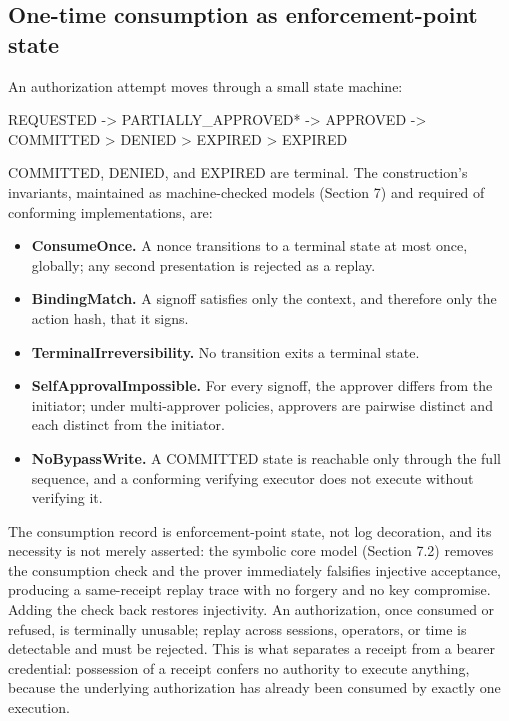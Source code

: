 \documentclass[11pt]{article}
\begin{document}
\subsection{One-time consumption as enforcement-point state}

An authorization attempt moves through a small state machine:

\begin{tool}
REQUESTED -> {PARTIALLY_APPROVED}* -> APPROVED -> COMMITTED
          \-> DENIED                          \-> EXPIRED
          \-> EXPIRED
\end{tool}

COMMITTED, DENIED, and EXPIRED are terminal. The construction's invariants,
maintained as machine-checked models (Section 7) and required of conforming
implementations, are:

\begin{itemize}[leftmargin=*]
\item \textbf{ConsumeOnce.} A nonce transitions to a terminal state at most once,
globally; any second presentation is rejected as a replay.
\item \textbf{BindingMatch.} A signoff satisfies only the context, and therefore
only the action hash, that it signs.
\item \textbf{TerminalIrreversibility.} No transition exits a terminal state.
\item \textbf{SelfApprovalImpossible.} For every signoff, the approver differs
from the initiator; under multi-approver policies, approvers are pairwise distinct
and each distinct from the initiator.
\item \textbf{NoBypassWrite.} A COMMITTED state is reachable only through the full
sequence, and a conforming verifying executor does not execute without verifying
it.
\end{itemize}

The consumption record is enforcement-point state, not log decoration, and its
necessity is not merely asserted: the symbolic core model (Section 7.2) removes the
consumption check and the prover immediately falsifies injective acceptance,
producing a same-receipt replay trace with no forgery and no key compromise.
Adding the check back restores injectivity. An authorization, once consumed or
refused, is terminally unusable; replay across sessions, operators, or time is
detectable and must be rejected. This is what separates a receipt from a bearer
credential: possession of a receipt confers no authority to execute anything,
because the underlying authorization has already been consumed by exactly one
execution.
\end{document}
